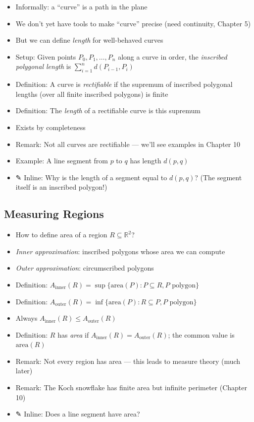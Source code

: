 \documentclass[
  10pt,
  letterpaper,
]{scrbook}
\providecommand{\tightlist}{%
  \setlength{\itemsep}{0pt}\setlength{\parskip}{0pt}}
\begin{document}
\begin{itemize}
\tightlist
\item
  Informally: a ``curve'' is a path in the plane
\item
  We don't yet have tools to make ``curve'' precise (need continuity,
  Chapter 5)
\item
  But we can define \emph{length} for well-behaved curves
\item
  Setup: Given points \(P_0, P_1, \ldots, P_n\) along a curve in order,
  the \emph{inscribed polygonal length} is
  \(\sum_{i=1}^{n} d(P_{i-1}, P_i)\)
\item
  Definition: A curve is \emph{rectifiable} if the supremum of inscribed
  polygonal lengths (over all finite inscribed polygons) is finite
\item
  Definition: The \emph{length} of a rectifiable curve is this supremum
\item
  Exists by completeness
\item
  Remark: Not all curves are rectifiable --- we'll see examples in
  Chapter 10
\item
  Example: A line segment from \(p\) to \(q\) has length \(d(p, q)\)
\item
  ✎ Inline: Why is the length of a segment equal to \(d(p, q)\)? (The
  segment itself is an inscribed polygon!)
\end{itemize}

\subsection{Measuring Regions}\label{measuring-regions}

\begin{itemize}
\tightlist
\item
  How to define area of a region \(R \subseteq \mathbb{R}^2\)?
\item
  \emph{Inner approximation}: inscribed polygons whose area we can
  compute
\item
  \emph{Outer approximation}: circumscribed polygons
\item
  Definition:
  \(A_{\text{inner}}(R) = \sup\{\text{area}(P) : P \subseteq R, P \text{ polygon}\}\)
\item
  Definition:
  \(A_{\text{outer}}(R) = \inf\{\text{area}(P) : R \subseteq P, P \text{ polygon}\}\)
\item
  Always \(A_{\text{inner}}(R) \leq A_{\text{outer}}(R)\)
\item
  Definition: \(R\) has \emph{area} if
  \(A_{\text{inner}}(R) = A_{\text{outer}}(R)\); the common value is
  \(\text{area}(R)\)
\item
  Remark: Not every region has area --- this leads to measure theory
  (much later)
\item
  Remark: The Koch snowflake has finite area but infinite perimeter
  (Chapter 10)
\item
  ✎ Inline: Does a line segment have area?
\end{itemize}
\end{document}
